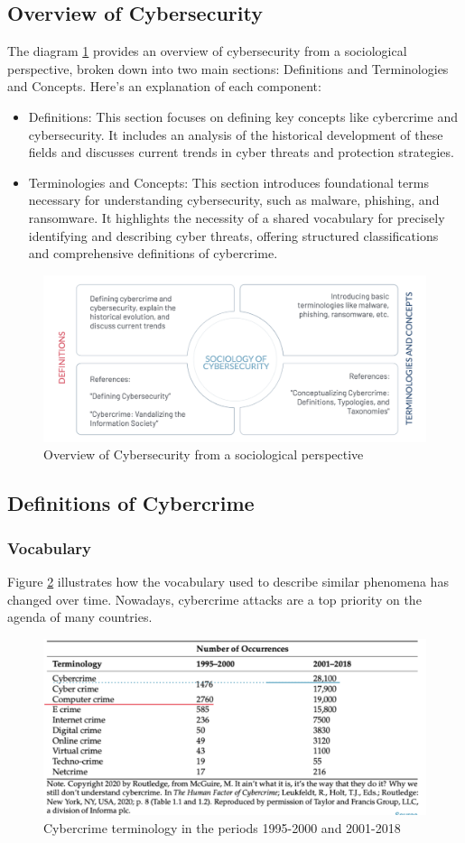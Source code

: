 \subsection{Overview of Cybersecurity}
The diagram \ref{fig:Overview} provides an overview of cybersecurity from a sociological perspective, broken down into two main sections: Definitions and Terminologies and Concepts. Here's an explanation of each component:
\begin{itemize}
    \item Definitions: This section focuses on defining key concepts like cybercrime and cybersecurity. It includes an analysis of the historical development of these fields and discusses current trends in cyber threats and protection strategies.
    \item Terminologies and Concepts: This section introduces foundational terms necessary for understanding cybersecurity, such as malware, phishing, and ransomware. It highlights the necessity of a shared vocabulary for precisely identifying and describing cyber threats, offering structured classifications and comprehensive definitions of cybercrime.
\end{itemize}

\begin{figure}[H]
    \centering
    \includegraphics[width=0.5\linewidth]{Images/Sociology/Overview.png}
    \caption{Overview of Cybersecurity from a sociological perspective}
    \label{fig:Overview}
\end{figure}

\subsection{Definitions of Cybercrime}
\subsubsection{Vocabulary}
Figure \ref{fig:Vocabulary1} illustrates how the vocabulary used to describe similar phenomena has changed over time. Nowadays, cybercrime attacks are a top priority on the agenda of many countries.
\begin{figure}[H]
    \centering
    \includegraphics[width=0.5\linewidth]{Images/Sociology/Vocabulary1.png}
    \caption{Cybercrime terminology in the periods 1995-2000 and 2001-2018}
    \label{fig:Vocabulary1}
\end{figure}

